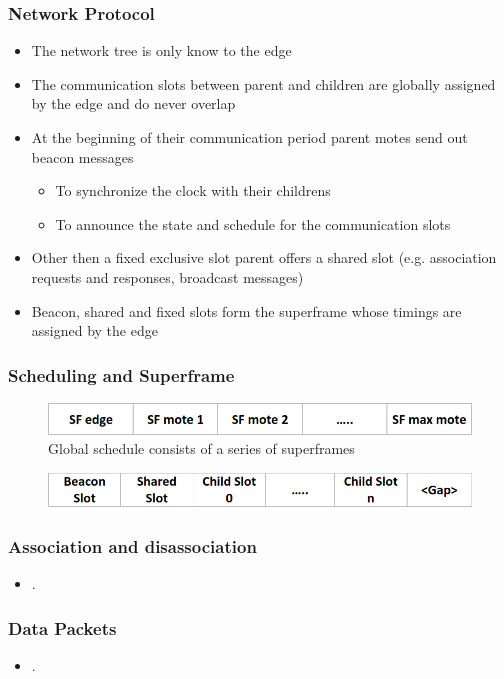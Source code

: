 \begin{frame}[fragile]
  \frametitle{Network Protocol}
  \begin{itemize}
    \item The network tree is only know to the edge
    \item The communication slots between parent and children are globally assigned by the edge and do never overlap
    \item At the beginning of their communication period parent motes send out beacon messages
    \begin{itemize}
      \item To synchronize the clock with their childrens
      \item To announce the state and schedule for the communication slots
    \end{itemize}
    \item Other then a fixed exclusive slot parent offers a shared slot (e.g. association requests and responses, broadcast messages)
    \item Beacon, shared and fixed slots form the superframe whose timings are assigned by the edge
  \end{itemize}
\end{frame}

\begin{frame}[fragile]
  \frametitle{Scheduling and Superframe}
  \begin{figure}
    \includegraphics[width=.9\textwidth]{img/6low_scheduling.png}
    \caption{Global schedule consists of a series of superframes}
  \end{figure}
  \begin{figure}
    \includegraphics[width=.9\textwidth]{img/6low_superframe.png}
  \end{figure}
\end{frame}

\begin{frame}[fragile]
  \frametitle{Association and disassociation}
  \begin{itemize}
    \item .
  \end{itemize}
\end{frame}

\begin{frame}[fragile]
  \frametitle{Data Packets}
  \begin{itemize}
    \item .
  \end{itemize}
\end{frame}